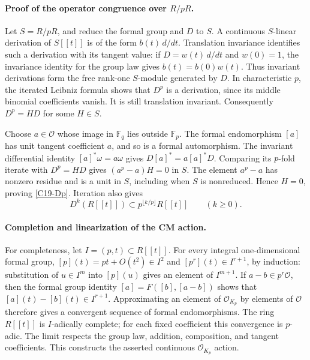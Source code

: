 \paragraph{Proof of the operator congruence over $R/pR$.}
Let $S=R/pR$, and reduce the formal group and $D$ to $S$.
A continuous $S$-linear derivation of $S[[t]]$ is of the form
$b(t)\,d/dt$.  Translation invariance identifies such a derivation
with its tangent value: if $D=w(t)\,d/dt$ and $w(0)=1$, the
invariance identity for the group law gives
$b(t)=b(0)w(t)$.  Thus invariant derivations form the free
rank-one $S$-module generated by $D$.
In characteristic $p$, the iterated Leibniz formula shows that
$D^p$ is a derivation, since its middle binomial coefficients
vanish.  It is still translation invariant.  Consequently
$D^p=H D$ for some $H\in S$.

Choose $a\in\mathcal O$ whose image in $\mathbb F_q$ lies outside
$\mathbb F_p$.  The formal endomorphism $[a]$ has unit tangent
coefficient $a$, and so is a formal automorphism.  The invariant
differential identity $[a]^*\omega=a\omega$ gives
$D[a]^*=a[a]^*D$.  Comparing its $p$-fold iterate with
$D^p=HD$ gives $(a^p-a)H=0$ in $S$.
The element $a^p-a$ has nonzero residue and is a unit in $S$,
including when $S$ is nonreduced.  Hence $H=0$, proving
\eqref{C19-Dp}.  Iteration also gives
\begin{equation}\label{C19-iterated-Dp}
 D^k(R[[t]])\subset p^{\lfloor k/p\rfloor}R[[t]]
       \qquad(k\geq0).
\end{equation}

\paragraph{Completion and linearization of the CM action.}
For completeness, let $I=(p,t)\subset R[[t]]$.
For every integral one-dimensional formal group,
$[p](t)=pt+O(t^2)\in I^2$ and
$[p^r](t)\in I^{r+1}$, by induction: substitution of
$u\in I^m$ into $[p](u)$ gives an element of $I^{m+1}$.
If $a-b\in p^r\mathcal O$, then the formal group identity
$[a]=F([b],[a-b])$ shows that
$[a](t)-[b](t)\in I^{r+1}$.
Approximating an element of $\mathcal O_{K_p}$ by elements of
$\mathcal O$ therefore gives a convergent sequence of formal
endomorphisms.  The ring $R[[t]]$ is $I$-adically complete;
for each fixed coefficient this convergence is $p$-adic.
The limit respects the group law, addition, composition, and
tangent coefficients.  This constructs the asserted continuous
$\mathcal O_{K_p}$ action.

